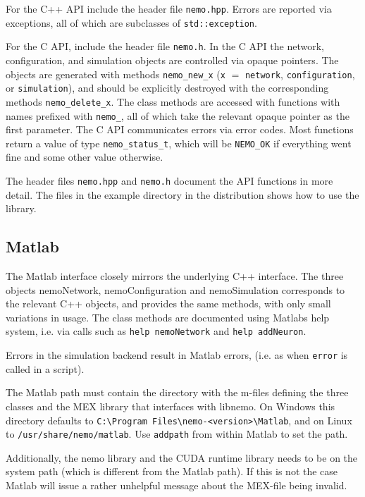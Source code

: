 \documentclass[a4paper]{article}
\newcommand{\code}[1]{\texttt{#1}}
\newcommand{\file}[1]{\texttt{#1}}
\begin{document}
For the C++ API include the header file \file{nemo.hpp}.
Errors are reported via exceptions, all of which are subclasses of \code{std::exception}.

For the C API, include the header file \file{nemo.h}. 
In the C API the network, configuration, and simulation objects are controlled
via opaque pointers.
The objects are generated with methods 
\code{nemo\_new\_x} (\code{x} $=$ \code{network}, \code{configuration}, or \code{simulation}),
and should be explicitly destroyed with the corresponding methods 
\code{nemo\_delete\_x}.
The class methods are accessed with functions with names prefixed with \code{nemo\_},
	all of which take the relevant opaque pointer as the first parameter.
The C API communicates errors via error codes.
Most functions return a value of type \code{nemo\_status\_t},
	which will be \code{NEMO\_OK} if everything went fine and some other value otherwise.

The header files \file{nemo.hpp} and \file{nemo.h} document the API functions in more detail.
The files in the example directory in the distribution shows how to use the library.

\subsection{Matlab}

The Matlab interface closely mirrors the underlying C++ interface.
The three objects nemoNetwork, nemoConfiguration and nemoSimulation corresponds
to the relevant C++ objects,
	and provides the same methods,
	with only small variations in usage.
The class methods are documented using Matlabs help system,
	i.e. via calls such as \code{help nemoNetwork} and \code{help addNeuron}.

Errors in the simulation backend result in Matlab errors,
	(i.e. as when \code{error} is called in a script).

The Matlab path must contain the directory with the m-files defining the three classes and the MEX
library that interfaces with libnemo.
On Windows this directory defaults to \file{C:\textbackslash Program Files\textbackslash nemo-<version>\textbackslash Matlab},
and on Linux to \file{/usr/share/nemo/matlab}.
Use \code{addpath} from within Matlab to set the path.

Additionally, the nemo library and the CUDA runtime library needs to be on the
system path (which is different from the Matlab path).
If this is not the case Matlab will issue a rather unhelpful message about the MEX-file being invalid.
\end{document}
